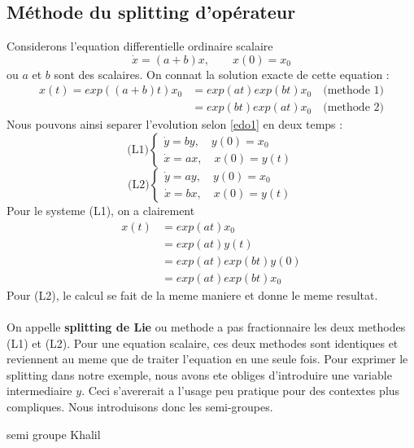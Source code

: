 \subsection{Méthode du splitting d’opérateur}
Considerons l’equation differentielle ordinaire scalaire
\begin{equation} \label{edo1}
\dot{x}=(a+b)x, \quad \quad x(0)=x_0
\end{equation}
ou $a$ et $b$ sont des scalaires. On connaıt la solution exacte de cette equation :
\begin{align*}
x(t)=exp((a+b)t)x_0 &= exp(at)exp(bt)x_0 \quad \mbox{(methode 1)}\\
&= exp(bt)exp(at)x_0 \quad \mbox{(methode 2)}
\end{align*}
Nous pouvons ainsi separer l'evolution selon \eqref{edo1} en deux temps :
$$\mbox{(L1)}
\begin{cases}
\dot{y}=by,\quad y(0)=x_0\\
\dot{x}=ax,\quad x(0)=y(t)
\end{cases}
$$
$$\mbox{(L2)}
\begin{cases}
\dot{y}=ay,\quad y(0)=x_0\\
\dot{x}=bx,\quad x(0)=y(t)
\end{cases}
$$
Pour le systeme (L1), on a clairement
\begin{align*}
x(t) &= exp(at)x_0\\
&= exp(at)y(t)\\
&= exp(at)exp(bt)y(0)\\
&= exp(at)exp(bt)x_0
\end{align*}
Pour (L2), le calcul se fait de la meme maniere et donne le meme resultat.\\\\
On appelle \textbf{splitting de Lie} ou methode a pas fractionnaire les deux methodes (L1) et (L2). Pour une equation scalaire, ces deux methodes sont identiques et reviennent au meme que de traiter l’equation en une seule fois.
Pour exprimer le splitting dans notre exemple, nous avons ete obliges d’introduire une variable intermediaire $y$. Ceci s’avererait a l’usage peu pratique pour des contextes plus compliques. Nous introduisons donc les semi-groupes.
\begin{definition}
	semi groupe Khalil
\end{definition}
